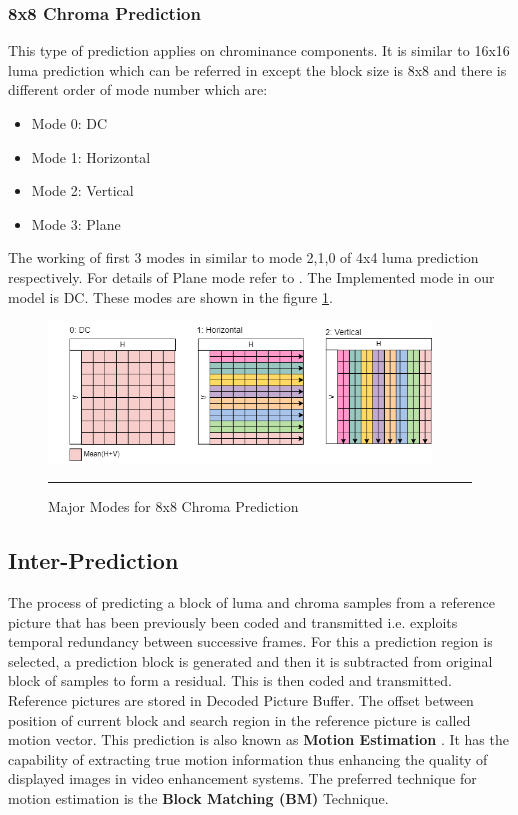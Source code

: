 \subsubsection{8x8 Chroma Prediction}
This type of prediction applies on chrominance components. It is similar to 16x16 luma prediction which can be referred in \cite{richardson2010h264} except the block size is 8x8 and there is different order of mode number which are:

\begin{itemize}
	\item Mode 0: DC
	\item Mode 1: Horizontal
	\item Mode 2: Vertical
	\item Mode 3: Plane
\end{itemize}

The working of first 3 modes in similar to mode 2,1,0 of 4x4 luma prediction respectively. For details of Plane mode refer to \cite{richardson2010h264}. The Implemented mode in our model is DC. These modes are shown in the figure \ref{fig:8x8modes}.

\begin{figure}[htbp]
	\centering
	\includegraphics[width = 4in]{./Figures/8x8modes.png}
	\rule{35em}{0.5pt}
	\caption{Major Modes for 8x8 Chroma Prediction}
	\label{fig:8x8modes}
\end{figure}


\subsection{Inter-Prediction}
The process of predicting a block of luma and chroma samples from a reference picture that has been previously been coded and transmitted i.e. exploits temporal redundancy between successive frames. For this a prediction region is selected, a prediction block is generated and then it is subtracted from original block of samples to form a residual. This is then coded and transmitted. Reference pictures are stored in Decoded Picture Buffer. The offset between position of current block and search region in the reference picture is called motion vector. This prediction is also known as \textbf{Motion Estimation} \cite{kalaycioglu2011low}. It has the capability of extracting true motion information thus enhancing the quality of displayed images in video enhancement systems. The preferred technique for motion estimation is the \textbf{Block Matching (BM)} Technique. 


